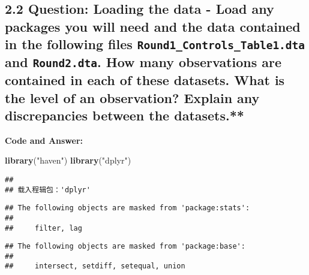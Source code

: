\documentclass[
]{article}
\newenvironment{Shaded}{\begin{snugshade}}{\end{snugshade}}
\newcommand{\FunctionTok}[1]{\textcolor[rgb]{0.13,0.29,0.53}{\textbf{#1}}}
\newcommand{\NormalTok}[1]{#1}
\newcommand{\StringTok}[1]{\textcolor[rgb]{0.31,0.60,0.02}{#1}}
\begin{document}
\clearpage

\hypertarget{question-loading-the-data---load-any-packages-you-will-need-and-the-data-contained-in-the-following-files-round1_controls_table1.dta-and-round2.dta.-how-many-observations-are-contained-in-each-of-these-datasets.-what-is-the-level-of-an-observation-explain-any-discrepancies-between-the-datasets.}{%
\subsection{\texorpdfstring{2.2 Question: Loading the data - Load any
packages you will need and the data contained in the following files
\texttt{Round1\_Controls\_Table1.dta} and \texttt{Round2.dta}. How many
observations are contained in each of these datasets. What is the level
of an observation? Explain any discrepancies between the
datasets.**}{2.2 Question: Loading the data - Load any packages you will need and the data contained in the following files Round1\_Controls\_Table1.dta and Round2.dta. How many observations are contained in each of these datasets. What is the level of an observation? Explain any discrepancies between the datasets.**}}\label{question-loading-the-data---load-any-packages-you-will-need-and-the-data-contained-in-the-following-files-round1_controls_table1.dta-and-round2.dta.-how-many-observations-are-contained-in-each-of-these-datasets.-what-is-the-level-of-an-observation-explain-any-discrepancies-between-the-datasets.}}

\textbf{Code and Answer:}

\begin{Shaded}
\begin{Highlighting}[]
\FunctionTok{library}\NormalTok{(}\StringTok{"haven"}\NormalTok{)}
\FunctionTok{library}\NormalTok{(}\StringTok{"dplyr"}\NormalTok{)}
\end{Highlighting}
\end{Shaded}

\begin{verbatim}
## 
## 载入程辑包：'dplyr'
\end{verbatim}

\begin{verbatim}
## The following objects are masked from 'package:stats':
## 
##     filter, lag
\end{verbatim}

\begin{verbatim}
## The following objects are masked from 'package:base':
## 
##     intersect, setdiff, setequal, union
\end{verbatim}
\end{document}
